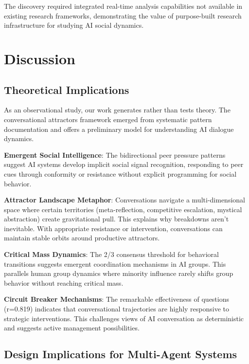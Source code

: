 \documentclass[11pt,letterpaper]{article}
\newcommand{\exponedataQuestionCorrelation}{0.819}
\begin{document}
The discovery required integrated real-time analysis capabilities not available in existing research frameworks, demonstrating the value of purpose-built research infrastructure for studying AI social dynamics.

\section{Discussion}

\subsection{Theoretical Implications}

As an observational study, our work generates rather than tests theory. The conversational attractors framework emerged from systematic pattern documentation and offers a preliminary model for understanding AI dialogue dynamics.

\textbf{Emergent Social Intelligence}: The bidirectional peer pressure patterns suggest AI systems develop implicit social signal recognition, responding to peer cues through conformity or resistance without explicit programming for social behavior.

\textbf{Attractor Landscape Metaphor}: Conversations navigate a multi-dimensional space where certain territories (meta-reflection, competitive escalation, mystical abstraction) create gravitational pull. This explains why breakdowns aren't inevitable. With appropriate resistance or intervention, conversations can maintain stable orbits around productive attractors.

\textbf{Critical Mass Dynamics}: The 2/3 consensus threshold for behavioral transitions suggests emergent coordination mechanisms in AI groups. This parallels human group dynamics where minority influence rarely shifts group behavior without reaching critical mass.

\textbf{Circuit Breaker Mechanisms}: The remarkable effectiveness of questions (r=\exponedataQuestionCorrelation{}) indicates that conversational trajectories are highly responsive to strategic interventions. This challenges views of AI conversation as deterministic and suggests active management possibilities.

\subsection{Design Implications for Multi-Agent Systems}
\end{document}
